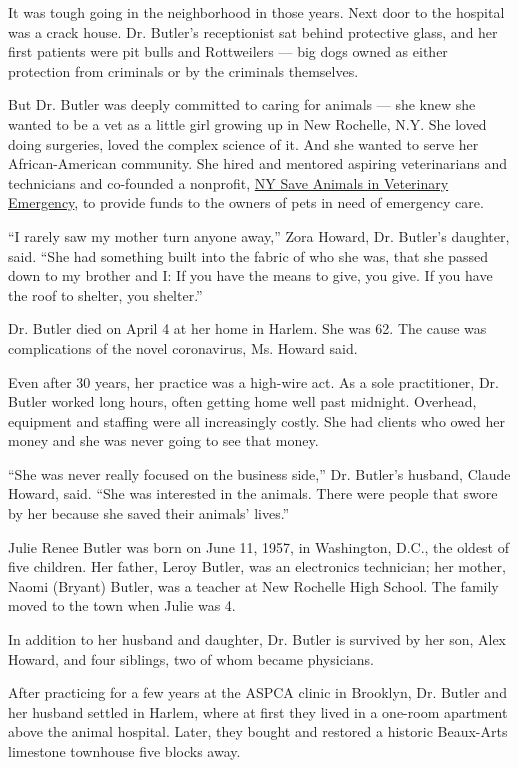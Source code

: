 It was tough going in the neighborhood in those years. Next door to the
hospital was a crack house. Dr. Butler's receptionist sat behind
protective glass, and her first patients were pit bulls and Rottweilers
--- big dogs owned as either protection from criminals or by the
criminals themselves.

But Dr. Butler was deeply committed to caring for animals --- she knew
she wanted to be a vet as a little girl growing up in New Rochelle, N.Y.
She loved doing surgeries, loved the complex science of it. And she
wanted to serve her African-American community. She hired and mentored
aspiring veterinarians and technicians and co-founded a nonprofit,
\href{https://www.nysave.org/}{NY Save Animals in Veterinary Emergency},
to provide funds to the owners of pets in need of emergency care.

``I rarely saw my mother turn anyone away,'' Zora Howard, Dr. Butler's
daughter, said. ``She had something built into the fabric of who she
was, that she passed down to my brother and I: If you have the means to
give, you give. If you have the roof to shelter, you shelter.''

Dr. Butler died on April 4 at her home in Harlem. She was 62. The cause
was complications of the novel coronavirus, Ms. Howard said.

Even after 30 years, her practice was a high-wire act. As a sole
practitioner, Dr. Butler worked long hours, often getting home well past
midnight. Overhead, equipment and staffing were all increasingly costly.
She had clients who owed her money and she was never going to see that
money.

``She was never really focused on the business side,'' Dr. Butler's
husband, Claude Howard, said. ``She was interested in the animals. There
were people that swore by her because she saved their animals' lives.''

Julie Renee Butler was born on June 11, 1957, in Washington, D.C., the
oldest of five children. Her father, Leroy Butler, was an electronics
technician; her mother, Naomi (Bryant) Butler, was a teacher at New
Rochelle High School. The family moved to the town when Julie was 4.

In addition to her husband and daughter, Dr. Butler is survived by her
son, Alex Howard, and four siblings, two of whom became physicians.

After practicing for a few years at the ASPCA clinic in Brooklyn, Dr.
Butler and her husband settled in Harlem, where at first they lived in a
one-room apartment above the animal hospital. Later, they bought and
restored a historic Beaux-Arts limestone townhouse five blocks away.

